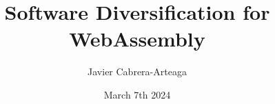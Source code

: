 
\title{ Software Diversification for WebAssembly }
\author{Javier Cabrera-Arteaga }
\date{March 7th 2024}


\address{KTH Royal Institute of Technology \\School of Electrical Engineering and Computer Science\\ Division of Software and Computer Systems \\ SE-10044 Stockholm\\ Sweden}

